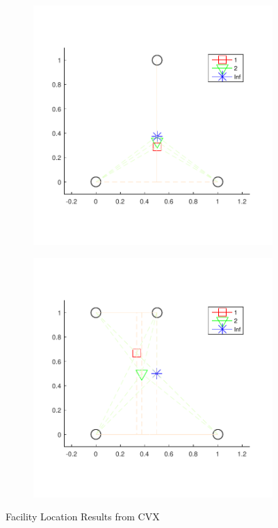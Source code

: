 \documentclass[letterpaper,12pt,]{article}
\begin{document}
\begin{figure}[ht]
\begin{subfigure}[b]{0.5\linewidth}
  \end{subfigure} 
  \begin{subfigure}[b]{0.5\linewidth}
    \centering
    \includegraphics[width=0.9\linewidth]{fac2} 
  \end{subfigure}%
  \begin{subfigure}[b]{0.5\linewidth}
    \centering
    \includegraphics[width=0.9\linewidth]{fac3} 
  \end{subfigure} 
  \caption{Facility Location Results from CVX}
  \label{fig:fac} 
\end{figure}
\end{document}
